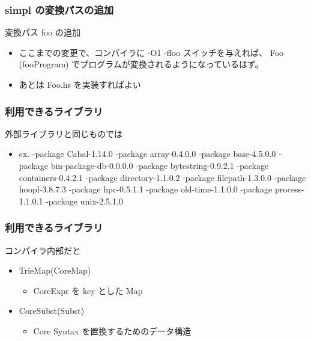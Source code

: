 \documentclass[cjk,dvipdfm,14pt]{beamer}
\begin{document}
\begin{frame}[fragile]
\frametitle{simpl の変換パスの追加}

変換パス foo の追加

\hrulefill

\begin{itemize}
\item ここまでの変更で、コンパイラに -O1 -ffoo スイッチを与えれば、
Foo (fooProgram) でプログラムが変換されるようになっているはず。
\item あとは Foo.hs を実装すればよい
\end{itemize}

\end{frame}


\begin{frame}[fragile]
\frametitle{利用できるライブラリ}

外部ライブラリと同じものでは

\begin{itemize}
\item ex. -package Cabal-1.14.0 -package array-0.4.0.0 -package base-4.5.0.0
-package bin-package-db-0.0.0.0 -package bytestring-0.9.2.1
-package containers-0.4.2.1 -package directory-1.1.0.2 -package filepath-1.3.0.0
-package hoopl-3.8.7.3 -package hpc-0.5.1.1 -package old-time-1.1.0.0
-package process-1.1.0.1 -package unix-2.5.1.0
\end{itemize}

\end{frame}


\begin{frame}[fragile]
\frametitle{利用できるライブラリ}

コンパイラ内部だと
\begin{itemize}
\item TrieMap(CoreMap)
 \begin{itemize}
 \item CoreExpr を key とした Map
 \end{itemize}
\item CoreSubst(Subst)
 \begin{itemize}
 \item Core Syntax を置換するためのデータ構造
 \end{itemize}
\end{itemize}
\end{frame}

\end{document}
